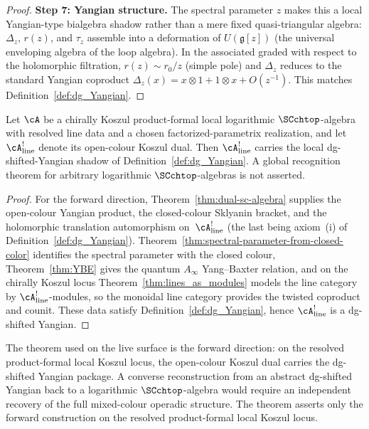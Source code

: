 \begin{proof}
\medskip
\noindent\textbf{Step 7: Yangian structure.}
The spectral parameter $z$ makes this a local Yangian-type bialgebra
shadow rather than a mere fixed quasi-triangular algebra: $\Delta_z$,
$r(z)$, and $\tau_z$ assemble into a deformation of
$U(\mathfrak{g}[z])$ (the universal enveloping algebra of the loop
algebra). In the associated graded with respect to the holomorphic
filtration, $r(z) \sim r_0/z$ (simple pole) and $\Delta_z$ reduces to
the standard Yangian coproduct $\Delta_z(x) = x \otimes 1 + 1 \otimes x
+ O(z^{-1})$. This matches Definition~\ref{def:dg_Yangian}.
\end{proof}

\begin{theorem}
\label{thm:yangian-recognition}
Let\/ $\cA$ be a chirally Koszul product-formal local logarithmic
$\SCchtop$-algebra with resolved line data and a chosen
factorized-parametrix realization, and let\/
$\cA^!_{\mathrm{line}}$ denote its open-colour Koszul dual. Then
$\cA^!_{\mathrm{line}}$ carries the local dg-shifted-Yangian shadow of
Definition~\textup{\ref{def:dg_Yangian}}. A global recognition theorem
for arbitrary logarithmic $\SCchtop$-algebras is not asserted.
\end{theorem}

\begin{proof}
For the forward direction, Theorem~\ref{thm:dual-sc-algebra}
supplies the open-colour Yangian product, the closed-colour
Sklyanin bracket, and the holomorphic translation automorphism
on~$\cA^!_{\mathrm{line}}$ (the last being
axiom~(i) of Definition~\ref{def:dg_Yangian}).
Theorem~\ref{thm:spectral-parameter-from-closed-color}
identifies the spectral parameter with the closed colour,
Theorem~\ref{thm:YBE} gives the quantum $A_\infty$
Yang--Baxter relation, and on the chirally Koszul locus
Theorem~\ref{thm:lines_as_modules} models the line category
by $\cA^!_{\mathrm{line}}$-modules, so the monoidal
line category
provides the twisted coproduct and counit. These data satisfy
Definition~\ref{def:dg_Yangian}, hence
$\cA^!_{\mathrm{line}}$ is a
dg-shifted Yangian.
\end{proof}

\begin{remark}
\label{rem:yangian-recognition-scope}
The theorem used on the live surface is the forward direction:
on the resolved product-formal local Koszul locus, the open-colour
Koszul dual carries the dg-shifted Yangian package. A converse
reconstruction from an abstract dg-shifted Yangian back to a
logarithmic $\SCchtop$-algebra would require an independent
recovery of the full mixed-colour operadic structure. The theorem
asserts only the forward construction on the resolved product-formal
local Koszul locus.
\end{remark}

